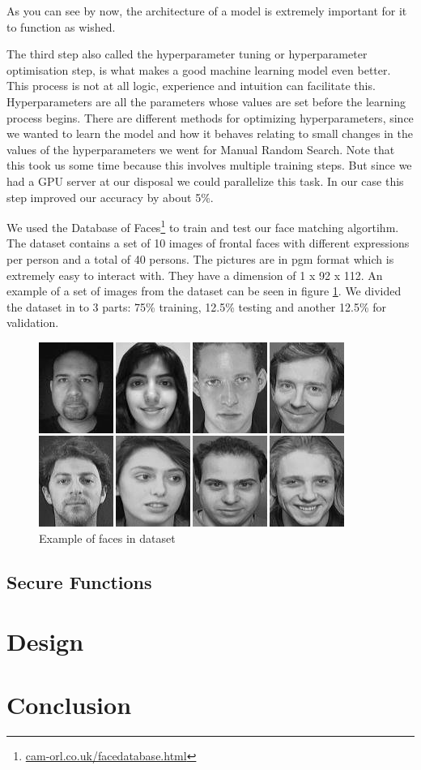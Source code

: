 As you can see by now, the architecture of a model is extremely important for it to function as wished.

The third step also called the hyperparameter tuning or hyperparameter optimisation step, is what makes a good machine learning model even better. This process is not at all logic, experience and intuition can facilitate this. Hyperparameters are all the parameters whose values are set before the learning process begins. There are different methods for optimizing hyperparameters, since we wanted to learn the model and how it behaves relating to small changes in the values of the hyperparameters we went for Manual Random Search. Note that this took us some time because this involves multiple training steps. But since we had a GPU server at our disposal we could parallelize this task. In our case this step improved our accuracy by about 5\%.

We used the Database of Faces\footnote{\url{cam-orl.co.uk/facedatabase.html}} to train and test our face matching algortihm. The dataset contains a set of 10 images of frontal faces with different expressions per person and a total of 40 persons. The pictures are in pgm format which is extremely easy to interact with. They have a dimension of 1 x 92 x 112. An example of a set of images from the dataset can be seen in figure \ref{fig:databaseoffaces}. We divided the dataset in to 3 parts: 75\% training, 12.5\% testing and another 12.5\% for validation.

\begin{figure}[H]
  \includegraphics[scale=0.7]{fig/databaseoffacess.png}
  \centering
  \caption{Example of faces in dataset}
  \label{fig:databaseoffaces}
\end{figure}

\subsection{Secure Functions}
\label{Secure Functions}

\section{Design}
\label{Design}


\section{Conclusion}
